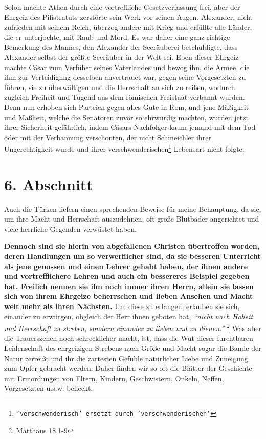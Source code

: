 \medskip

Solon machte Athen durch eine
vortreffliche Gesetzverfassung frei, aber der
Ehrgeiz des Pifistratuts zerstörte sein Werk vor
seinen Augen. Alexander, nicht
zufrieden mit seinem Reich, überzog andere mit Krieg und erfüllte alle Länder,
die er unterjochte, mit Raub und Mord. Es war daher eine ganz richtige Bemerkung
des Mannes, den Alexander der Seeräuberei beschuldigte, dass Alexander selbst
der größte Seeräuber in der Welt sei. Eben dieser Ehrgeiz machte
Cäsar zum
Verfüher seines Vaterlandes und bewog ihn, die Armee, die ihm zur
Verteidignng desselben anvertrauet war, gegen seine Vorgesetzten zu führen, sie
zu überwältigen und die Herrschaft an sich zu reißen, wodurch zugleich Freiheit
und Tugend aus dem römischen Freistaat verbannt
wurden. Denn nun erhoben sich
Parteien gegen alles Gute in Rom, und jene Mäßigkeit und
Maßheit, welche die
Senatoren zuvor so ehrwürdig machten, wurden
jetzt ihrer Sicherheit gefährlich,
indem Cäsars Nachfolger kaum jemand mit dem Tod oder mit der Verbannung
verschonten, der nicht Schmeichler ihrer Ungerechtigkeit wurde und ihrer
verschwenderischen\footnote{\texttt{'verschwenderisch' ersetzt durch
'verschwenderischen'}} Lebensart nicht folgte.

\section{6. Abschnitt} \label{kap8_ab6}

Auch die Türken liefern einen sprechenden Beweise für
meine Behauptung, da sie,
um ihre Macht und Herrschaft auszudehnen, oft große Blutbäder angerichtet und
viele herrliche Gegenden verwüstet haben.

\medskip

\label{ref:08_06_heiden}\textbf{Dennoch sind sie hierin von abgefallenen
Christen übertroffen worden, deren
Handlungen um so verwerflicher sind, da sie besseren Unterricht als jene
genossen
und einen Lehrer gehabt haben, der ihnen andere und vortrefflichere Lehren und
auch ein bessereres Beispiel gegeben hat. Freilich nennen sie ihn noch immer
ihren
Herrn, allein sie lassen sich von ihrem Ehrgeize beherrschen und lieben Ansehen
und Macht weit mehr als ihren Nächsten.} Um diese zu
erlangen, erlauben sie sich,
einander zu erwürgen,  obgleich der Herr ihnen
geboten hat,
\textit{"`nicht nach Hoheit
und Herrschaft zu streben, sondern einander zu lieben und zu
dienen."'}
\footnote{Matthäus 18,1-9}
Was aber die Trauerszenen noch schrecklicher
macht, ist, dass die Wut dieser furchtbaren Leidenschaft des ehrgeizigen
Strebens nach Größe und Macht sogar die Bande der Natur zerreißt und ihr die
zartesten Gefühle natürlicher Liebe und Zuneigung zum Opfer gebracht werden.
Daher finden wir so oft die Blätter der Geschichte mit Ermordungen von Eltern,
Kindern, Geschwistern, Onkeln, Neffen, Vorgesetzten u.s.w. befleckt.

